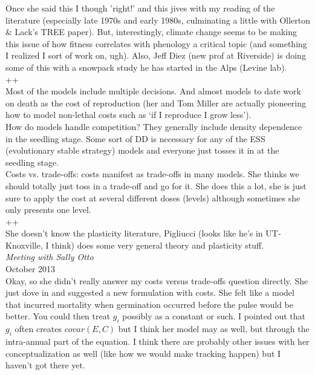 \documentclass[11pt,a4paper,oneside]{article}
\begin{document}
\noindent Once she said this I though 'right!' and this jives with my reading of the literature (especially late 1970s and early 1980s, culminating a little with Ollerton \& Lack's TREE paper). But, interestingly, climate change seems to be making this issue of how fitness correlates with phenology a critical topic (and something I realized I sort of work on, ugh). Also, Jeff Diez (new prof at Riverside) is doing some of this with a snowpack study he has started in the Alps (Levine lab).\\

++\\

\noindent Most of the models include multiple decisions. And almost models to date work on death as the cost of reproduction (her and Tom Miller are actually pioneering how to model non-lethal costs such as `if I reproduce I grow less').\\

\noindent How do models handle competition? They generally include density dependence in the seedling stage. Some sort of DD is necessary for any of the ESS (evolutionary stable strategy) models and everyone just tosses it in at the seedling stage.\\

\noindent Costs vs. trade-offs: costs manifest as trade-offs in many models. She thinks we should totally just toss in a trade-off and go for it. She does this a lot, she is just sure to apply the cost at several different doses (levels) although sometimes she only presents one level.\\

++\\

\noindent She doesn't know the plasticity literature, Pigliucci (looks like he's in UT-Knoxville, I think) does some very general theory and plasticity stuff. \\

\newpage
\noindent \emph{Meeting with Sally Otto} \\

 October 2013\\

\noindent Okay, so she didn't really answer my costs versus trade-offs question directly. She just dove in and suggested a new formulation with costs. She felt like a model that incurred mortality when germination occurred before the pulse would be better. You could then treat \(g_{i}\) possibly as a constant or such. I pointed out that \(g_{i}\) often creates \(covar(E,C)\) but I think her model may as well, but through the intra-annual part of the equation. I think there are probably other issues with her conceptualization as well (like how we would make tracking happen) but I haven't got there yet.\\
\end{document}
